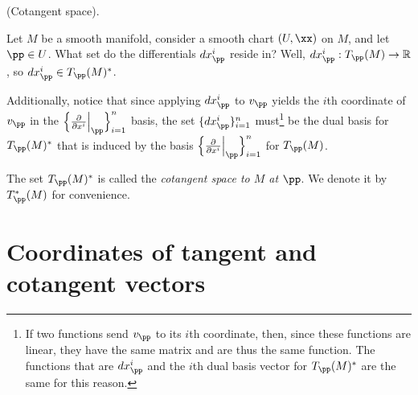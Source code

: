 \begin{deriv}
    (Cotangent space).

    Let $M$ be a smooth manifold, consider a smooth chart $(U, \xx)$ on $M$, and let $\pp \in U$. What set do the differentials $dx^i_\pp$ reside in? Well, $dx^i_\pp:T_\pp(M) \rightarrow \R$, so $dx^i_\pp \in T_\pp(M)^*$.
    
    Additionally, notice that since applying $dx^i_\pp$ to $v_\pp$ yields the $i$th coordinate of $v_\pp$ in the $\Big\{ \frac{\pd}{\pd x^i}\Big|_\pp \Big\}_{i = 1}^n$ basis, the set $\{dx^i_\pp\}_{i = 1}^n$ must\footnote{If two functions send $v_\pp$ to its $i$th coordinate, then, since these functions are linear, they have the same matrix and are thus the same function. The functions that are $dx^i_\pp$ and the $i$th dual basis vector for $T_\pp(M)^*$ are the same for this reason.} be the dual basis for $T_\pp(M)^*$ that is induced by the basis $\Big\{ \frac{\pd}{\pd x^i}\Big|_\pp \Big\}_{i = 1}^n$ for $T_\pp(M)$.

    The set $T_\pp(M)^*$ is called the \textit{cotangent space to $M$ at $\pp$}. We denote it by $T_\pp^*(M)$ for convenience.
\end{deriv}

\section{Coordinates of tangent and cotangent vectors}

